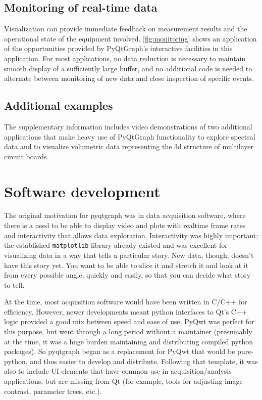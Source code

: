 \subsection{Monitoring of real-time data}
\makeMonitoringFig
Visualization can provide immediate feedback on measurement results and the operational state of the equipment involved. \autoref{fig:monitoring} shows an application of the opportunities provided by PyQtGraph's interactive facilities in this application. For most applications, no data reduction is necessary to maintain smooth display of a sufficiently large buffer, and no additional code is needed to alternate between monitoring of new data and close inspection of specific events.

\subsection{Additional examples}
The supplementary information includes video demonstrations of two additional applications that make heavy use of PyQtGraph functionality to explore spectral data and to visualize volumetric data representing the 3d structure of multilayer circuit boards.

\section{Software development}
The original motivation for pyqtgraph was in data acquisition software, where there is a need to be able to display video and plots with realtime frame rates and interactivity that allows data exploration. Interactivity was highly important; the established \texttt{matplotlib} library already existed and was excellent for visualizing data in a way that tells a particular story. New data, though, doesn't have this story yet. You want to be able to slice it and stretch it and look at it from every possible angle, quickly and easily, so that you can decide what story to tell.

At the time, most acquisition software would have been written in C/C++ for efficiency. However, newer developments meant python interfaces to Qt's C++ logic provided a good mix between speed and ease of use. PyQwt was perfect for this purpose, but went through a long period without a maintainer (presumably at the time, it was a huge burden maintaining and distributing compiled python packages). So pyqtgraph began as a replacement for PyQwt that would be pure-python, and thus easier to develop and distribute. Following that template, it was also to include UI elements that have common use in acquisition/analysis applications, but are missing from Qt (for example, tools for adjusting image contrast, parameter trees, etc.).

